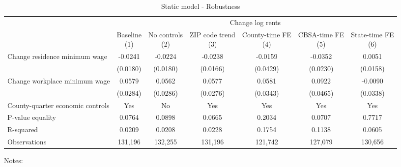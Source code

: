 \begin{table}
    \caption{Static model - Robustness}
    \label{tab:static_robust}
    \centering

    \begin{tabular}{@{}lcccccc@{}}
        \toprule
                                                  & \multicolumn{6}{c}{Change log rents}                                          \\ \cmidrule(l){2-7}
                                                  & \shortstack{Baseline\\(1)}       & \shortstack{No controls\\(2)} & \shortstack{ZIP code trend\\(3)} 
                                                  & \shortstack{County-time FE\\(4)} & \shortstack{CBSA-time FE\\(5)} & \shortstack{State-time FE\\(6)} \\ \midrule
        Change residence minimum wage             & -0.0241      & -0.0224         & -0.0238       & -0.0159        & -0.0352       & 0.0051             \\
                                                  & (0.0180)    & (0.0180)       & (0.0166)     & (0.0429)      & (0.0230)     & (0.0158)           \\
        Change workplace minimum wage             & 0.0579      & 0.0562         & 0.0577       & 0.0581        & 0.0922       & -0.0090             \\
                                                  & (0.0284)    & (0.0286)       & (0.0276)     & (0.0343)      & (0.0465)     & (0.0338)           \\  \midrule
        County-quarter economic controls               & Yes      &  No         & Yes       & Yes        & Yes       & Yes             \\
        P-value equality                          & 0.0764      & 0.0898         & 0.0665       & 0.2034        & 0.0707       & 0.7717             \\
        R-squared                                 & 0.0209      & 0.0208         & 0.0228       & 0.1754        & 0.1138       & 0.0605             \\
        Observations                              & 131,196     & 132,255        & 131,196      & 121,742       & 127,079      & 130,656            \\ \bottomrule
    \end{tabular}

    \begin{minipage}{.95\textwidth} \footnotesize
        \vspace{2mm}
        Notes: 
    \end{minipage}
\end{table}
